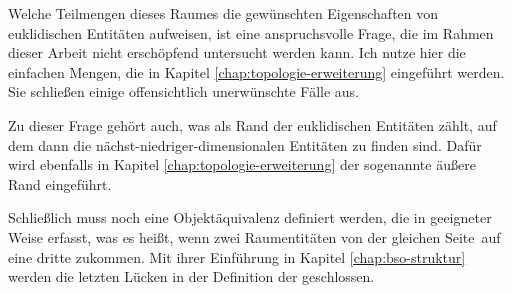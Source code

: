         Welche Teilmengen dieses Raumes die gewünschten Eigenschaften von euklidischen Entitäten aufweisen, ist eine anspruchsvolle Frage, die im Rahmen dieser Arbeit nicht erschöpfend untersucht werden kann.
        Ich nutze hier die einfachen Mengen, die in Kapitel \ref{chap:topologie-erweiterung} eingeführt werden.
        Sie schließen einige offensichtlich unerwünschte Fälle aus.

        Zu dieser Frage gehört auch, was als Rand der euklidischen Entitäten zählt, auf dem dann die nächst-niedriger-dimensionalen Entitäten zu finden sind.
        Dafür wird ebenfalls in Kapitel \ref{chap:topologie-erweiterung} der sogenannte äußere Rand eingeführt.

        Schließlich muss noch eine Objektäquivalenz definiert werden, die in geeigneter Weise erfasst, was es heißt, wenn zwei Raumentitäten \glqq von der gleichen Seite\grqq\ auf eine dritte zukommen.
        Mit ihrer Einführung in Kapitel \ref{chap:bso-struktur} werden die letzten Lücken in der Definition der \strukt geschlossen.
